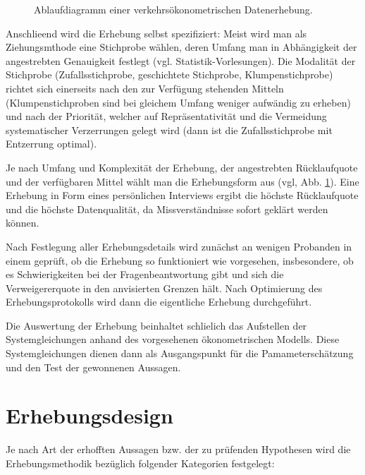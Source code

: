 \begin{figure}
\caption{\label{fig:erh-flussdiag}Ablaufdiagramm einer
verkehrs\"okonometrischen Datenerhebung.
}
\end{figure}



Anschlie\3end wird die Erhebung selbst spezifiziert: Meist wird man
als Ziehungsmthode eine Stichprobe w\"ahlen, deren Umfang man in
Abh\"angigkeit der angestrebten Ge\-nau\-ig\-keit festlegt
(vgl.  Statistik-Vorlesungen).
Die Modalit\"at der Stichprobe (Zufallsstichprobe,
geschichtete Stichprobe, Klumpenstichprobe)
richtet sich einerseits nach den zur Ver\-f\"u\-gung stehenden Mitteln
(Klumpenstichproben sind bei gleichem Umfang weniger aufw\"andig zu
erheben) und nach der Priorit\"at, welcher auf Repr\"asentativit\"at
und die Vermeidung
systematischer Verzerrungen gelegt wird (dann ist die
Zufallsstichprobe mit Entzerrung optimal).

Je nach Umfang und Komplexit\"at der Erhebung, 
der angestrebten R\"ucklaufquote und der verf\"ugbaren Mittel
w\"ahlt man die Erhebungsform aus (vgl, Abb. \ref{fig:erh-flussdiag}).  
Eine Erhebung in Form eines
pers\"onlichen Interviews ergibt die h\"ochste R\"ucklaufquote und die
h\"ochste Datenqualit\"at, da Missverst\"andnisse sofort gekl\"art
werden k\"onnen.

Nach Festlegung aller Erhebungsdetails wird zun\"achst an wenigen 
Probanden in einem  gepr\"uft, ob die Erhebung so
funktioniert wie vorgesehen, insbesondere, ob es Schwierigkeiten bei
der Fragenbeantwortung gibt und sich die Verweigererquote in den
anvisierten Grenzen
h\"alt. Nach Optimierung des Erhebungsprotokolls wird dann die
eigentliche Erhebung durch\-gef\"uhrt. 

Die Auswertung der Erhebung
beinhaltet schlie\3lich das Aufstellen der Systemgleichungen anhand des
vorgesehenen \"okonometrischen Modells. Diese Systemgleichungen dienen
dann als Ausgangspunkt f\"ur die Pamametersch\"atzung und den Test der
gewonnenen Aussagen.

\section{\label{sec:erh-meth}Erhebungsdesign}
Je nach Art der erhofften Aussagen bzw. der zu pr\"ufenden Hypothesen
wird die Erhebungsmethodik bez\"uglich folgender Kategorien
festgelegt:


